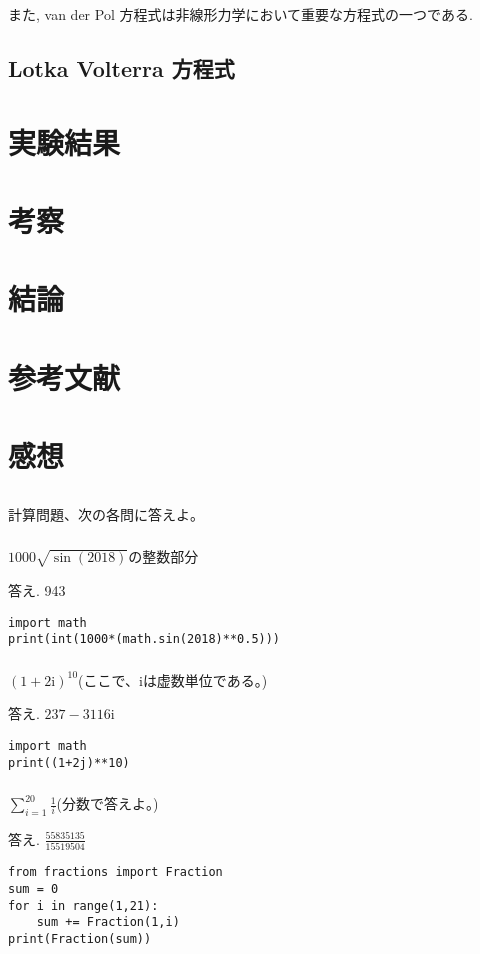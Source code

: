 \documentclass[12pt,a4paper]{jsarticle}
\begin{document}
また, van der Pol 方程式は非線形力学において重要な方程式の一つである. 

\subsection{Lotka Volterra 方程式}

\section{実験結果}
\section{考察}
\section{結論}
\section{参考文献}
\section{感想}






\subsection{}
計算問題、次の各問に答えよ。
\subsubsection{}
$1000\sqrt{\sin(2018)}$の整数部分\par
答え. 943
\begin{lstlisting}
import math
print(int(1000*(math.sin(2018)**0.5)))
\end{lstlisting}
\subsubsection{}
$(1+2\mathrm{i})^{10}$(ここで、$\mathrm{i}$は虚数単位である。)\par
答え. $237-3116\mathrm{i}$
\begin{lstlisting}
import math
print((1+2j)**10)
\end{lstlisting}
\subsubsection{}
$\displaystyle\sum_{i=1}^{20} \frac{1}{i}$(分数で答えよ。)\par
答え. $\displaystyle\frac{55835135}{15519504}$\\
\begin{lstlisting}
from fractions import Fraction
sum = 0
for i in range(1,21):
    sum += Fraction(1,i)
print(Fraction(sum))
\end{lstlisting}
\end{document}
